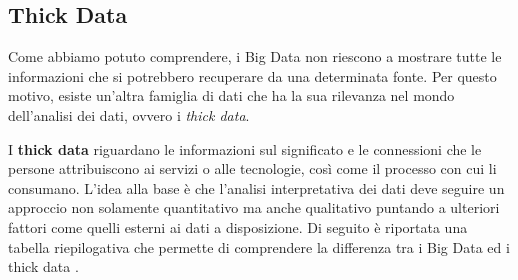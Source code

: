 \subsection{Thick Data}

Come abbiamo potuto comprendere, i Big Data non riescono a mostrare tutte le informazioni che si potrebbero recuperare da una determinata fonte. Per questo motivo, esiste un'altra famiglia di dati che ha la sua rilevanza nel mondo dell'analisi dei dati, ovvero i \textit{thick data}.

I \textbf{thick data} riguardano le informazioni sul significato e le connessioni che le persone attribuiscono ai servizi o alle tecnologie, così come il processo con cui li consumano. L'idea alla base è che l'analisi interpretativa dei dati deve seguire un approccio non solamente quantitativo ma anche qualitativo puntando a ulteriori fattori come quelli esterni ai dati a disposizione. Di seguito è riportata una tabella riepilogativa che permette di comprendere la differenza tra i Big Data ed i thick data \cite{big_data_and_thick_data}.

